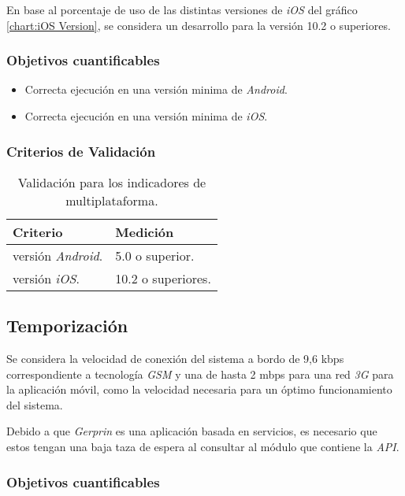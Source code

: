 En base al porcentaje de uso de las distintas versiones de \emph{iOS} del gráfico \ref{chart:iOS Version}, se considera un desarrollo para la versión 10.2 o superiores.

\subsubsection{Objetivos cuantificables}

\begin{itemize}
	\item
	Correcta ejecución en una versión minima de \emph{Android}.
	\item
	Correcta ejecución en una versión minima de \emph{iOS}.
\end{itemize}

\subsubsection{Criterios de Validación}

\begin{table}[H]
    \caption[Validación para los indicadores de multiplataforma.] {Validación para los indicadores de multiplataforma.}
    \label{tbl:Criterios de Validación multiplataforma}
    \begin{tabular}{|p{}|p{}|}
        \hline
        \textbf{Criterio} &  \textbf{Medición}\\
    	\hline
    	\hline
    	versión \emph{Android}. & 5.0 o superior. \\ \hline
		versión \emph{iOS}.  & 10.2 o superiores. \\ 
        \hline
    \end{tabular}
\end{table}

\subsection{Temporización}

Se considera la velocidad de conexión del sistema a bordo de 9,6 kbps correspondiente a tecnología \emph{GSM} y una de hasta 2 mbps para una red \emph{3G} para la aplicación móvil, como la velocidad necesaria para un óptimo funcionamiento del sistema.

Debido a que \emph{Gerprin} es una aplicación basada en servicios, es necesario que estos tengan una baja taza de espera al consultar al módulo que contiene la \emph{API}.

\subsubsection{Objetivos cuantificables}

